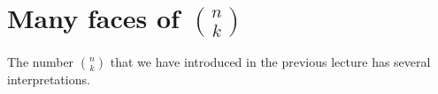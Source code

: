 

\setcounter{section}{3}
\setcounter{subsection}{1}
\setcounter{dfn}{0}

\section{Many faces of $\binom{n}{k}$}
The number $\binom{n}{k}$ that we have introduced in the previous lecture has several interpretations.

